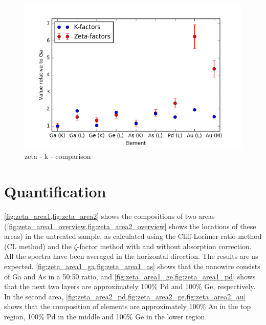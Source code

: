 \begin{figure}[h]
	\centering
	\includegraphics[width=0.7\linewidth]{fig/other/zeta-k-plot-new}
	\caption{zeta - k - comparison}
	\label{fig:zeta-k-comparison}
\end{figure}

\section{Quantification}


\cref{fig:zeta_area1,fig:zeta_area2} shows the compositions of two areas (\cref{fig:zeta_area1_overview,fig:zeta_area2_overview} shows the locations of these areas) in the untreated sample, as calculated using the Cliff-Lorimer ratio method (CL method) and the $\zeta$-factor method with and without absorption correction. All the spectra have been averaged in the horizontal direction. The results are as expected. \cref{fig:zeta_area1_ga,fig:zeta_area1_as} shows that the nanowire consists of Ga and As in a 50:50 ratio, and \cref{fig:zeta_area1_ge,fig:zeta_area1_pd} shows that the next two layers are approximately 100\% Pd and 100\% Ge, respectively. In the second area, \cref{fig:zeta_area2_pd,fig:zeta_area2_ge,fig:zeta_area2_au} shows that the composition of elements are approximately 100\% Au in the top region, 100\% Pd in the middle and 100\% Ge in the lower region.

